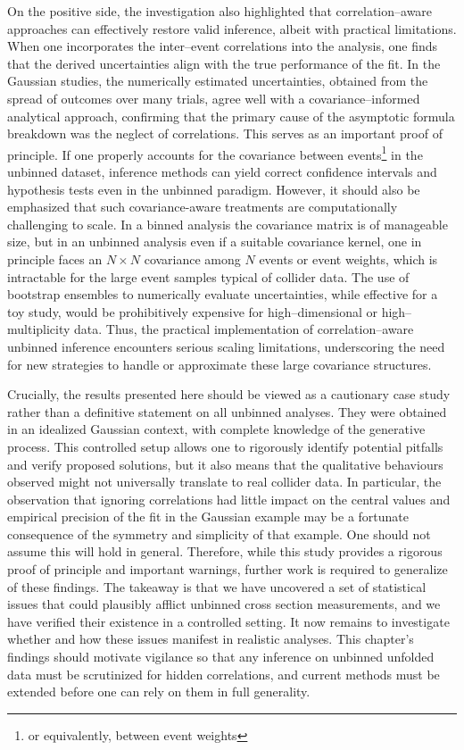     On the positive side, the investigation also highlighted that correlation--aware approaches can effectively restore valid inference, albeit with practical limitations.
    When one incorporates the inter--event correlations into the analysis, one finds that the derived uncertainties align with the true performance of the fit.
    In the Gaussian studies, the numerically estimated uncertainties, obtained from the spread of outcomes over many trials, agree well with a covariance--informed analytical approach, confirming that the primary cause of the asymptotic formula breakdown was the neglect of correlations.
    This serves as an important proof of principle.
    If one properly accounts for the covariance between events\footnote{or equivalently, between event weights} in the unbinned dataset, inference methods can yield correct confidence intervals and hypothesis tests even in the unbinned paradigm.
    However, it should also be emphasized that such covariance-aware treatments are computationally challenging to scale.
    In a binned analysis the covariance matrix is of manageable size, but in an unbinned analysis even if a suitable covariance kernel, one in principle faces an $N \times N$ covariance among $N$ events or event weights, which is intractable for the large event samples typical of collider data.
    The use of bootstrap ensembles to numerically evaluate uncertainties, while effective for a toy study, would be prohibitively expensive for high--dimensional or high--multiplicity data.
    Thus, the practical implementation of correlation--aware unbinned inference encounters serious scaling limitations, underscoring the need for new strategies to handle or approximate these large covariance structures.

    Crucially, the results presented here should be viewed as a cautionary case study rather than a definitive statement on all unbinned analyses. 
    They were obtained in an idealized Gaussian context, with complete knowledge of the generative process.
    This controlled setup allows one to rigorously identify potential pitfalls and verify proposed solutions, but it also means that the qualitative behaviours observed might not universally translate to real collider data.
    In particular, the observation that ignoring correlations had little impact on the central values and empirical precision of the fit in the Gaussian example may be a fortunate consequence of the symmetry and simplicity of that example.
    One should not assume this will hold in general.
    Therefore, while this study provides a rigorous proof of principle and important warnings, further work is required to generalize of these findings.
    The takeaway is that we have uncovered a set of statistical issues that could plausibly afflict unbinned cross section measurements, and we have verified their existence in a controlled setting.
    It now remains to investigate whether and how these issues manifest in realistic analyses.
    This chapter’s findings should motivate vigilance so that any inference on unbinned unfolded data must be scrutinized for hidden correlations, and current methods must be extended before one can rely on them in full generality.

